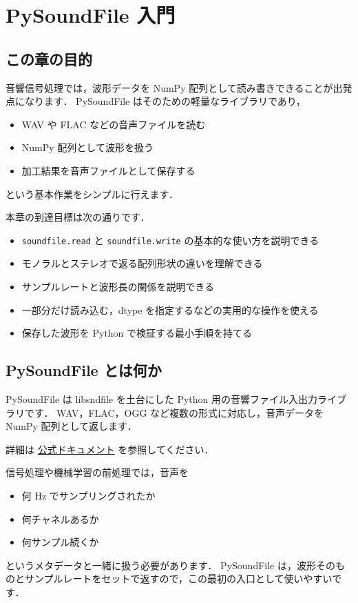 
\chapter{PySoundFile 入門}


\section{この章の目的}

音響信号処理では，波形データを NumPy 配列として読み書きできることが出発点になります．
PySoundFile はそのための軽量なライブラリであり，
\begin{itemize}
\item WAV や FLAC などの音声ファイルを読む
\item NumPy 配列として波形を扱う
\item 加工結果を音声ファイルとして保存する
\end{itemize}
という基本作業をシンプルに行えます．

本章の到達目標は次の通りです．
\begin{itemize}
\item \texttt{soundfile.read} と \texttt{soundfile.write} の基本的な使い方を説明できる
\item モノラルとステレオで返る配列形状の違いを理解できる
\item サンプルレートと波形長の関係を説明できる
\item 一部分だけ読み込む，dtype を指定するなどの実用的な操作を使える
\item 保存した波形を Python で検証する最小手順を持てる
\end{itemize}


\section{PySoundFile とは何か}

PySoundFile は libsndfile を土台にした Python 用の音響ファイル入出力ライブラリです．
WAV，FLAC，OGG など複数の形式に対応し，音声データを NumPy 配列として返します．

詳細は \href{https://pysoundfile.readthedocs.io/en/latest/}{公式ドキュメント} を参照してください．

信号処理や機械学習の前処理では，音声を
\begin{itemize}
\item 何 Hz でサンプリングされたか
\item 何チャネルあるか
\item 何サンプル続くか
\end{itemize}
というメタデータと一緒に扱う必要があります．
PySoundFile は，波形そのものとサンプルレートをセットで返すので，この最初の入口として使いやすいです．



